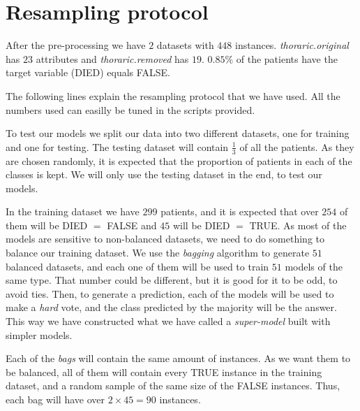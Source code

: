 \section{Resampling protocol}

After the pre-processing we have $2$ datasets with $448$ instances. \textit{thoraric.original} has $23$ attributes and \textit{thoraric.removed} has $19$. $0.85\%$ of the patients have the target variable (DIED) equals FALSE.

The following lines explain the resampling protocol that we have used. All the numbers used can easilly be tuned in the scripts provided.

To test our models we split our data into two different datasets, one for training and one for testing. The testing dataset will contain $\frac{1}{3}$ of all the patients. As they are chosen randomly, it is expected that the proportion of patients in each of the classes is kept. We will only use the testing dataset in the end, to test our models.

In the training dataset we have $299$ patients, and it is expected that over $254$ of them will be DIED $=$ FALSE and $45$ will be DIED $=$ TRUE.
As most of the models are sensitive to non-balanced datasets, we need to do something to balance our training dataset. We use the \textit{bagging} algorithm to generate $51$ balanced datasets, and each one of them will be used to train $51$ models of the same type. That number could be different, but it is good for it to be odd, to avoid ties. Then, to generate a prediction, each of the models will be used to make a \textit{hard} vote, and the class predicted by the majority will be the answer. This way we have constructed what we have called a \textit{super-model} built with simpler models.

Each of the \textit{bags} will contain the same amount of instances. As we want them to be balanced, all of them will contain every TRUE instance in the training dataset, and a random sample of the same size of the FALSE instances. Thus, each bag will have over $2 \times 45 = 90$ instances.
